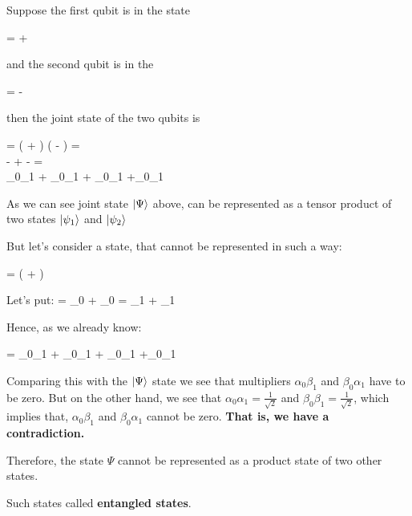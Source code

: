 \documentclass{article}
\begin{document}
Suppose the first qubit is in the state



\beqn
{} =  + 
\eeq

and the second qubit is in the 

\beqn
{} =  - 
\eeq

then the joint state of the two qubits is

\beqn
\ket{\Psi} = \left(  +  \right) \otimes \left(  -   \right) = \\
 -  +  -  = \\
\alpha_{0}\alpha_{1}{} + \alpha_{0}\beta_{1}{} + \beta_{0}\alpha_{1}{} +\beta_{0}\beta_{1}{}
\eeq

As we can see joint state $\ket{\Psi}$ above, can be represented as a tensor product of two states $\ket{\psi_1}$ and $\ket{\psi_2}$ 


But let's consider a state, that cannot be represented in such a way:

\beqn
\ket{\Psi} = \left(   +   \right)
\eeq

Let's put:
\beqn
{} = \alpha_0  + \beta_0 
\eeq
\beqn
{} = \alpha_1  + \beta_1 
\eeq

Hence, as we already know:

\beqn
{} = \alpha_{0}\alpha_{1}{} + \alpha_{0}\beta_{1}{} + \beta_{0}\alpha_{1}{} +\beta_{0}\beta_{1}{}
\eeq

Comparing this with the $\ket{\Psi}$ state we see that multipliers $\alpha_0\beta_1$ and $\beta_0\alpha_1$ have to be zero.
But on the other hand, we see that $\alpha_0\alpha_1 = \frac{1}{\sqrt{2}}$ and $\beta_0\beta_1 = \frac{1}{\sqrt{2}}$, which implies that,
$\alpha_0\beta_1$ and $\beta_0\alpha_1$ cannot be zero. \textbf{That is, we have a contradiction.}

Therefore, the state $\Psi$ cannot be represented as a product state of two other states.

Such states called \textbf{entangled states}.


\end{document}
